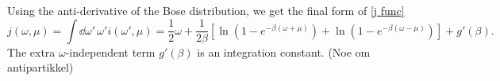 Using the anti-derivative of the Bose distribution, we get the final form of \autoref{j func}
\begin{equation}
    j(\omega, \mu) = \int \dd \omega'\, \omega' i(\omega', \mu)
    =  
    \frac{1}{2}\omega + \frac{1}{2\beta} 
    \left[
        \ln\left(1 - e^{-\beta(\omega + \mu)}\right)
        + \ln\left(1 - e^{-\beta(\omega - \mu)}\right)
    \right]
    + g'(\beta).
\end{equation}
The extra $\omega$-independent term $g'(\beta)$ is an integration constant.
(Noe om antipartikkel)

